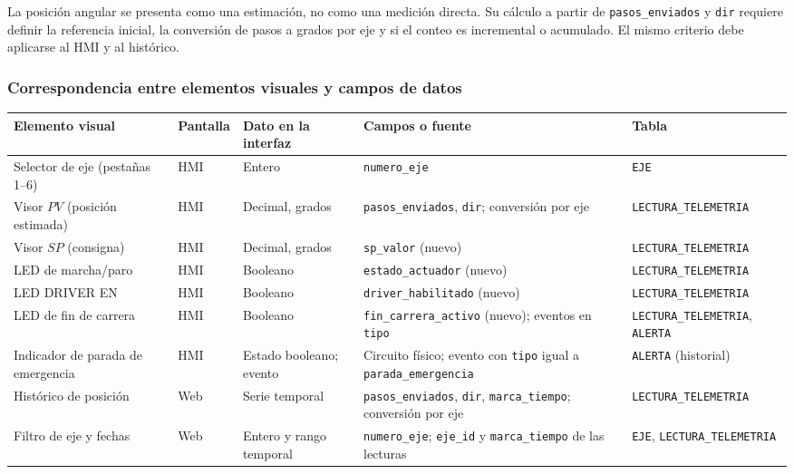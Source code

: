 \documentclass[11pt]{article}
\newcommand{\campo}[1]{\nolinkurl{#1}}
\begin{document}
\begin{enumerate}[leftmargin=1.4em]
	La posición angular se presenta como una estimación, no como una medición directa. Su cálculo a partir de \campo{pasos_enviados} y \campo{dir} requiere definir la referencia inicial, la conversión de pasos a grados por eje y si el conteo es incremental o acumulado. El mismo criterio debe aplicarse al HMI y al histórico.
	
	\subsubsection*{Correspondencia entre elementos visuales y campos de datos}
	
	\begin{center}
		\footnotesize
		\setlength{\tabcolsep}{3pt}
		\renewcommand{\arraystretch}{1.1}
		\begin{tabularx}{\linewidth}{@{}>{\raggedright\arraybackslash}p{2.6cm}>{\raggedright\arraybackslash}p{1.4cm}>{\raggedright\arraybackslash}p{2.1cm}>{\raggedright\arraybackslash}X>{\raggedright\arraybackslash}p{3.1cm}@{}}
			\toprule
			\textbf{Elemento visual} & \textbf{Pantalla} & \textbf{Dato en la interfaz} & \textbf{Campos o fuente} & \textbf{Tabla} \\
			\midrule
			Selector de eje (pestañas 1--6) & HMI & Entero & \campo{numero_eje} & \campo{EJE} \\
			Visor $PV$ (posición estimada) & HMI & Decimal, grados & \campo{pasos_enviados}, \campo{dir}; conversión por eje & \campo{LECTURA_TELEMETRIA} \\
			Visor $SP$ (consigna) & HMI & Decimal, grados & \campo{sp_valor} (nuevo) & \campo{LECTURA_TELEMETRIA} \\
			LED de marcha/paro & HMI & Booleano & \campo{estado_actuador} (nuevo) & \campo{LECTURA_TELEMETRIA} \\
			LED DRIVER EN & HMI & Booleano & \campo{driver_habilitado} (nuevo) & \campo{LECTURA_TELEMETRIA} \\
			LED de fin de carrera & HMI & Booleano & \campo{fin_carrera_activo} (nuevo); eventos en \campo{tipo} & \campo{LECTURA_TELEMETRIA}, \campo{ALERTA} \\
			Indicador de parada de emergencia & HMI & Estado booleano; evento & Circuito físico; evento con \campo{tipo} igual a \campo{parada_emergencia} & \campo{ALERTA} (historial) \\
			Histórico de posición & Web & Serie temporal & \campo{pasos_enviados}, \campo{dir}, \campo{marca_tiempo}; conversión por eje & \campo{LECTURA_TELEMETRIA} \\
			Filtro de eje y fechas & Web & Entero y rango temporal & \campo{numero_eje}; \campo{eje_id} y \campo{marca_tiempo} de las lecturas & \campo{EJE}, \campo{LECTURA_TELEMETRIA} \\

\end{tabularx}
\end{center}
\end{enumerate}
\end{document}
